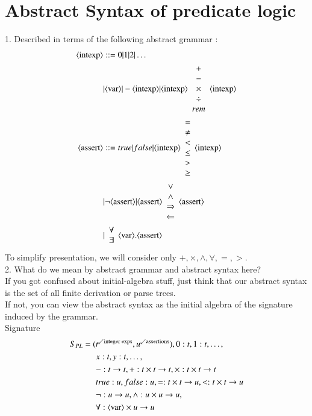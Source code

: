 \documentclass{article}[12pt]
\begin{document}
\section{Abstract Syntax of predicate logic}
1. Described in terms of the following abstract grammar : \\
\begin{align*}
    \langle \text{intexp}\rangle &::= 0 | 1 | 2 | \ldots \\
    &| \langle \text{var}\rangle | -\langle \text{intexp}\rangle | \langle \text{intexp}\rangle \begin{array}{c} + \\ - \\ \times \\ \div \\ rem \end{array} \langle \text{intexp}\rangle \\
    \langle \text{assert}\rangle &::= true | false | \langle \text{intexp}\rangle \begin{array}{c} = \\ \neq \\ < \\ \le \\ > \\ \ge \end{array} \langle \text{intexp}\rangle \\
    &| \neg \langle \text{assert}\rangle | \langle \text{assert}\rangle \begin{array}{c} \vee \\ \wedge \\ \Rightarrow \\ \Leftarrow \end{array} \langle \text{assert}\rangle \\
    &| \begin{array}{c} \forall \\ \exists \end{array} \langle \text{var}\rangle. \langle \text{assert}\rangle
\end{align*}
To simplify presentation, we will consider only $+, \times, \wedge, \forall, =, >$. \\
2. What do we mean by abstract grammar and abstract syntax here? \\
If you got confused about initial-algebra stuff, just think that our abstract syntax is the set of all finite derivation or parse trees. \\
If not, you can view the abstract syntax as the initial algebra of the signature induced by the grammar. \\
Signature
\begin{align*}
    S_{PL} = (&t^{\swarrow \text{integer exps}}, u^{\swarrow \text{assertions}}), 0:t, 1:t, \ldots, \\
    &x:t, y:t, \ldots, \\
    &-:t\rightarrow t, +:t \times t \rightarrow t, \times : t \times t \rightarrow t \\
    &true : u, false : u, =:t \times t \rightarrow u, < : t\times t \rightarrow u \\
    &\neg : u \rightarrow u, \wedge : u \times u \rightarrow u, \\
    &\forall : \langle \text{var}\rangle \times u \rightarrow u
\end{align*}
\end{document}
